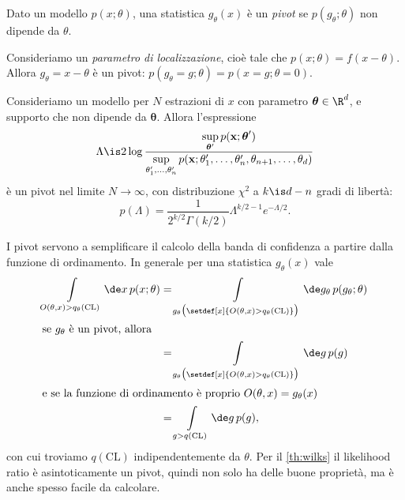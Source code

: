 \begin{definition}[Pivot]
	Dato un modello $p(x;\theta)$,
	una statistica $g_\theta(x)$ è un \emph{pivot}
	se $p(g_\theta;\theta)$ non dipende da $\theta$.
\end{definition}

\begin{example}
	Consideriamo un \emph{parametro di localizzazione},
	cioè tale che $p(x;\theta)=f(x-\theta)$.
	Allora $g_\theta=x-\theta$ è un pivot:
	$p(g_\theta=g;\theta) = p(x=g;\theta=0)$.
\end{example}

\begin{fact}
	\label{th:wilks}
	Consideriamo un modello per $N$ estrazioni di $x$ con parametro $\boldsymbol\theta\in\R^d$,
	e supporto che non dipende da $\boldsymbol\theta$.
	Allora l'espressione
	\begin{equation*}
		\Lambda \is
		2\log\frac {\sup\limits_{\boldsymbol\theta'} p(\mathbf x;\boldsymbol\theta')}
		{\sup\limits_{\theta_1',\dotsc,\theta_n'} p(\mathbf x;\theta_1',\dotsc,\theta_n',\theta_{n+1},\dots,\theta_d)}
	\end{equation*}
	è un pivot nel limite $N\to\infty$,
	con distribuzione $\chi^2$ a $k\is d-n$ gradi di libertà:
	\begin{equation*}
		p(\Lambda)
		= \frac1{2^{k/2}\Gamma(k/2)} \Lambda^{k/2-1} e^{-\Lambda/2}.
	\end{equation*}
\end{fact}

I pivot servono a semplificare il calcolo della banda di confidenza a partire dalla funzione di ordinamento.
In generale per una statistica $g_\theta(x)$ vale
\begin{align*}
	\int\limits_{O(\theta,x)>q_\theta(\mathrm{CL})} \de x\, p(x;\theta)
	&= \int\limits_{g_\theta\big(\setdef[x]{O(\theta,x)>q_\theta(\mathrm{CL})}\big)}
	\de g_\theta\, p(g_\theta;\theta) \\
	\intertext{se $g_\theta$ è un pivot, allora}
	&= \int\limits_{g_\theta\big(\setdef[x]{O(\theta,x)>q_\theta(\mathrm{CL})}\big)}
	 \de g\, p(g) \\
	\intertext{e se la funzione di ordinamento è proprio $O(\theta,x)=g_\theta(x)$}
	&= \int\limits_{g>q(\mathrm{CL})} \de g\, p(g),
\end{align*}
con cui troviamo $q(\mathrm{CL})$ indipendentemente da $\theta$.
Per il \autoref{th:wilks} il likelihood ratio è asintoticamente un pivot,
quindi non solo ha delle buone proprietà,
ma è anche spesso facile da calcolare.
